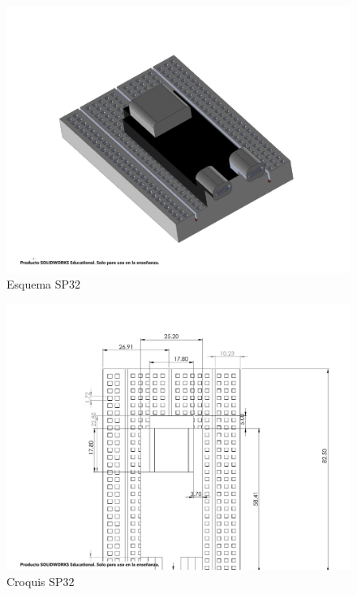     \begin{figure}[H]
        \centering
        \includegraphics[trim = {10mm 10mm 10mm 10mm},clip,scale=0.2]{25/img/SP32.pdf}
        \caption{Esquema SP32}
        \label{fig:lcd-16x2}
    \end{figure}
    \begin{figure}[H]
        \centering
        \includegraphics[trim = {10mm 10mm 10mm 10mm},clip,scale=0.2]{25/img/Croquis ESP32.pdf}
        \caption{Croquis SP32}
        \label{fig:lcd-16x2}
    \end{figure}
